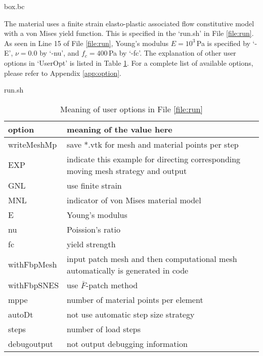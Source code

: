 \documentclass[10pt,a4paper]{article}
\begin{document}
\begin{file}[label=file:box_bc]{box.bc}

\end{file}

The material uses a finite strain elasto-plastic associated flow constitutive model with a von Mises yield function. This is specified in the `run.sh' in File \ref{file:run}. As seen in Line 15 of File \ref{file:run}, Young's modulus $E=10^3$\,Pa is specified by `-E', $\nu=0.0$ by `-nu', and $f_c=400$\,Pa by `-fc'. The explanation of other user options in `UserOpt' is listed in Table \ref{tab:opt}. For a complete list of available options, please refer to Appendix \ref{app:option}.

\begin{file}[label=file:run]{run.sh}

\end{file}

\begin{table}[!ht]
\caption{Meaning of user options in File \ref{file:run}}
\label{tab:opt}
\begin{tabular}{lp{}}
\toprule
option & meaning of the value here\\
\midrule
writeMeshMp & save *.vtk for mesh and material points per step  \\
EXP & indicate this example for directing corresponding moving mesh strategy and output \\
GNL & use finite strain \\
MNL & indicator of von Mises material model \\
E & Young's modulus \\
nu & Poission's ratio \\
fc & yield strength \\
withFbpMesh & input patch mesh and then computational mesh automatically is generated in code \\
withFbpSNES & use $\bar{F}$-patch method \\
mppe & number of material points per element \\
autoDt & not use automatic step size strategy \\
steps & number of load steps \\
debugoutput & not output debugging information \\
\bottomrule
\end{tabular}
\end{table}
\end{document}

